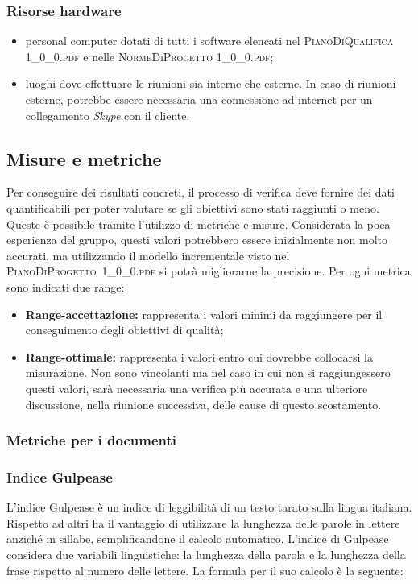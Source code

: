		\subsubsection{Risorse hardware}
		\begin{itemize}
			\item personal computer dotati di tutti i software elencati nel \textsc{PianoDiQualifica 1\_0\_0.pdf} e nelle \textsc{NormeDiProgetto 1\_0\_0.pdf};
			\item luoghi dove effettuare le riunioni sia interne che esterne. In caso di riunioni esterne, potrebbe essere necessaria una connessione ad internet per un collegamento \textit{Skype} con il cliente.
		\end{itemize}
		
						
	\subsection{Misure e metriche}
		Per conseguire dei risultati concreti, il processo di verifica deve fornire dei dati quantificabili per poter valutare se gli obiettivi sono stati raggiunti o meno. Queste è possibile tramite l’utilizzo di metriche e misure. Considerata la poca esperienza del gruppo, questi valori potrebbero essere inizialmente non molto accurati, ma utilizzando il modello incrementale visto nel \hbox{\textsc{PianoDiProgetto 1\_0\_0.pdf}} si potrà migliorarne la precisione.
		Per ogni metrica sono indicati due range:
		\begin{itemize}
			\item \textbf{Range-accettazione: }rappresenta i valori minimi da raggiungere per il conseguimento degli obiettivi di qualità;
			\item \textbf{Range-ottimale: }rappresenta i valori entro cui dovrebbe collocarsi la misurazione. Non sono vincolanti ma nel caso in cui non si raggiungessero questi valori, sarà necessaria una verifica più accurata e una ulteriore discussione, nella riunione successiva, delle cause di questo scostamento.
		\end{itemize}
	
		\subsubsection{Metriche per i documenti}
		
		\subsubsection{Indice Gulpease }
		L'indice Gulpease è un indice di leggibilità di un testo tarato sulla lingua italiana. Rispetto ad altri ha il vantaggio di utilizzare la lunghezza delle parole in lettere anziché in sillabe, semplificandone il calcolo automatico.
		L'indice di Gulpease considera due variabili linguistiche: la lunghezza della parola e la lunghezza della frase rispetto al numero delle lettere.
		La formula per il suo calcolo è la seguente:
		
